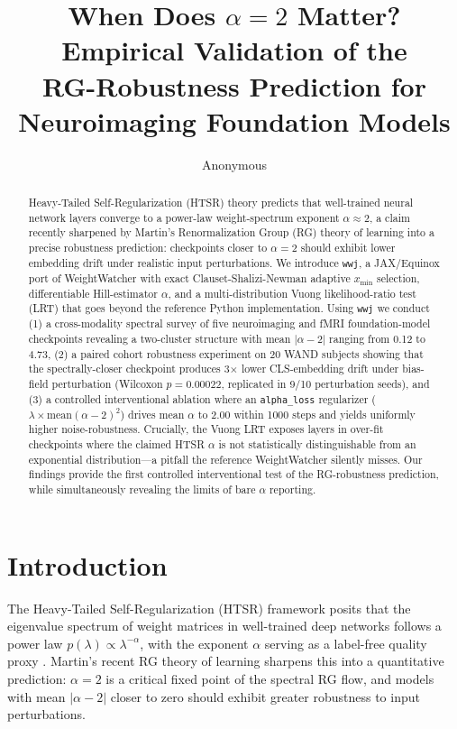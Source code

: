 \documentclass{article} %
\title{When Does $\alpha = 2$ Matter? Empirical Validation of the\\
RG-Robustness Prediction for Neuroimaging Foundation Models}
\author{Anonymous}
\theoremstyle{plain}
\theoremstyle{definition}
\theoremstyle{remark}
\begin{document}
\maketitle

\begin{abstract}
Heavy-Tailed Self-Regularization (HTSR) theory predicts that well-trained neural network layers converge to a power-law weight-spectrum exponent $\alpha \approx 2$, a claim recently sharpened by Martin's Renormalization Group (RG) theory of learning \citep{martin2026rg} into a precise robustness prediction: checkpoints closer to $\alpha = 2$ should exhibit lower embedding drift under realistic input perturbations. We introduce \texttt{wwj}, a JAX/Equinox port of WeightWatcher with exact Clauset-Shalizi-Newman adaptive $x_{\min}$ selection, differentiable Hill-estimator $\alpha$, and a multi-distribution Vuong likelihood-ratio test (LRT) that goes beyond the reference Python implementation. Using \texttt{wwj} we conduct (1) a cross-modality spectral survey of five neuroimaging and fMRI foundation-model checkpoints revealing a two-cluster structure with mean $|\alpha - 2|$ ranging from 0.12 to 4.73, (2) a paired cohort robustness experiment on 20 WAND subjects showing that the spectrally-closer checkpoint produces 3$\times$ lower CLS-embedding drift under bias-field perturbation (Wilcoxon $p = 0.00022$, replicated in 9/10 perturbation seeds), and (3) a controlled interventional ablation where an \texttt{alpha\_loss} regularizer ($\lambda \times \text{mean}(\alpha - 2)^2$) drives mean $\alpha$ to 2.00 within 1000 steps and yields uniformly higher noise-robustness. Crucially, the Vuong LRT exposes layers in over-fit checkpoints where the claimed HTSR $\alpha$ is not statistically distinguishable from an exponential distribution---a pitfall the reference WeightWatcher silently misses. Our findings provide the first controlled interventional test of the RG-robustness prediction, while simultaneously revealing the limits of bare $\alpha$ reporting.
\end{abstract}

\section{Introduction}
\label{sec:intro}

The Heavy-Tailed Self-Regularization (HTSR) framework \citep{martin2021implicit} posits that the eigenvalue spectrum of weight matrices in well-trained deep networks follows a power law $p(\lambda) \propto \lambda^{-\alpha}$, with the exponent $\alpha$ serving as a label-free quality proxy \citep{martin2021predicting}. Martin's recent RG theory of learning \citep{martin2026rg} sharpens this into a quantitative prediction: $\alpha = 2$ is a critical fixed point of the spectral RG flow, and models with mean $|\alpha - 2|$ closer to zero should exhibit greater robustness to input perturbations.
\end{document}
